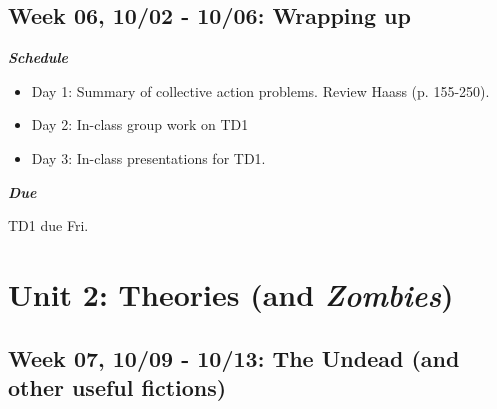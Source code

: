 \documentclass[11pt,]{article}
\begin{document}
\newpage

\hypertarget{week-06-1002---1006-wrapping-up}{%
\subsection{Week 06, 10/02 - 10/06: Wrapping
up}\label{week-06-1002---1006-wrapping-up}}

\begin{multicols}{2}

\textbf{\textit{Schedule}}

\begin{itemize}

\item Day 1: Summary of collective action problems. Review Haass (p. 155-250).

\item Day 2: In-class group work on TD1

\item Day 3: In-class presentations for TD1.

\end{itemize}

\columnbreak

\begin{flushright}

\textbf{\textit{Due}}

TD1 due Fri.

\end{flushright}

\end{multicols}

\hypertarget{unit-2-theories-and-zombies}{%
\section{\texorpdfstring{Unit 2: Theories (and
\emph{Zombies})}{Unit 2: Theories (and Zombies)}}\label{unit-2-theories-and-zombies}}

\hypertarget{week-07-1009---1013-the-undead-and-other-useful-fictions}{%
\subsection{Week 07, 10/09 - 10/13: The Undead (and other useful
fictions)}\label{week-07-1009---1013-the-undead-and-other-useful-fictions}}
\end{document}
